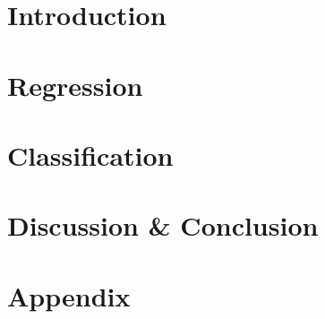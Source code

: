 \documentclass{article}
\begin{document}






\setcounter{tocdepth}{2}
\tableofcontents
{}

\newpage
{}
\section{Introduction}


\section{Regression}








\section{Classification}





\vspace{- 0.2 cm}
\section{Discussion \&  Conclusion}\label{sec:discussion}


\newpage



\section*{Appendix}
{}




\end{document}
